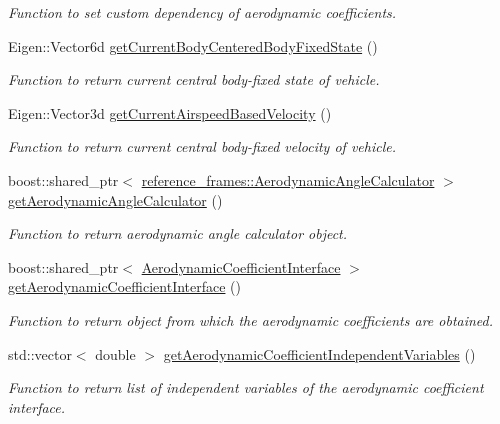 \begin{DoxyCompactItemize}
\begin{DoxyCompactList}\small\item\em Function to set custom dependency of aerodynamic coefficients. \end{DoxyCompactList}\item 
Eigen\+::\+Vector6d \hyperlink{classtudat_1_1aerodynamics_1_1FlightConditions_a52bb2cc9d5748b7f1c0f96ad9d2de54e}{get\+Current\+Body\+Centered\+Body\+Fixed\+State} ()
\begin{DoxyCompactList}\small\item\em Function to return current central body-\/fixed state of vehicle. \end{DoxyCompactList}\item 
Eigen\+::\+Vector3d \hyperlink{classtudat_1_1aerodynamics_1_1FlightConditions_a00c11388084a2789dd9fc5afb368699f}{get\+Current\+Airspeed\+Based\+Velocity} ()
\begin{DoxyCompactList}\small\item\em Function to return current central body-\/fixed velocity of vehicle. \end{DoxyCompactList}\item 
boost\+::shared\+\_\+ptr$<$ \hyperlink{classtudat_1_1reference__frames_1_1AerodynamicAngleCalculator}{reference\+\_\+frames\+::\+Aerodynamic\+Angle\+Calculator} $>$ \hyperlink{classtudat_1_1aerodynamics_1_1FlightConditions_a8764be01f8e409922da4d773fb922ded}{get\+Aerodynamic\+Angle\+Calculator} ()
\begin{DoxyCompactList}\small\item\em Function to return aerodynamic angle calculator object. \end{DoxyCompactList}\item 
boost\+::shared\+\_\+ptr$<$ \hyperlink{classtudat_1_1aerodynamics_1_1AerodynamicCoefficientInterface}{Aerodynamic\+Coefficient\+Interface} $>$ \hyperlink{classtudat_1_1aerodynamics_1_1FlightConditions_a34dc838cf637ea11ee10b14c3ebfd1d7}{get\+Aerodynamic\+Coefficient\+Interface} ()
\begin{DoxyCompactList}\small\item\em Function to return object from which the aerodynamic coefficients are obtained. \end{DoxyCompactList}\item 
std\+::vector$<$ double $>$ \hyperlink{classtudat_1_1aerodynamics_1_1FlightConditions_a84146564b6d8a1296760ccd554285956}{get\+Aerodynamic\+Coefficient\+Independent\+Variables} ()
\begin{DoxyCompactList}\small\item\em Function to return list of independent variables of the aerodynamic coefficient interface. \end{DoxyCompactList}\item 

\end{DoxyCompactItemize}
